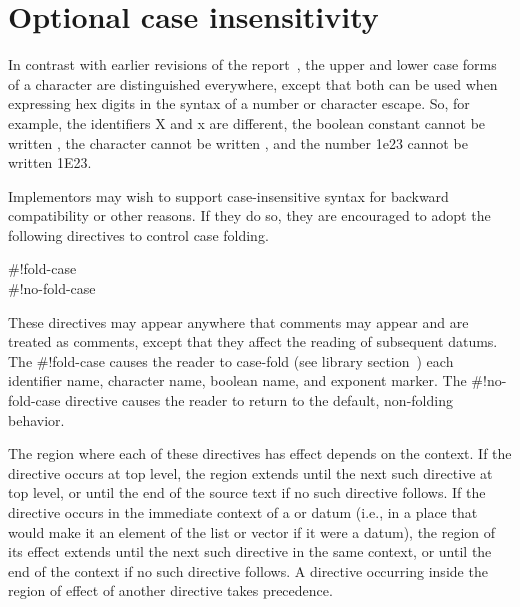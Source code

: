 \chapter{Optional case insensitivity}
\label{caseinsensitivityappendix}

In contrast with earlier revisions of the report~\cite{R5RS}, the upper
and lower case forms of a character are distinguished everywhere, except
that both can be used when expressing hex digits in the syntax of a number
or character escape. 
So, for example, the identifiers {\cf X} and {\cf x} are different, the
boolean constant \schtrue{} cannot be written , the
character  cannot be written , and the
number {\cf 1e23} cannot be written {\cf 1E23}.

Implementors may wish to support case-insensitive syntax for backward
compatibility or other reasons.
If they do so, they are encouraged to adopt the following directives
to control case folding.

\begin{entry}{%
{\cf{}\#!fold-case}\\
{\cf{}\#!no-fold-case}}

These directives may appear anywhere that comments may appear and are
treated as comments, except that they affect the reading of subsequent
datums.
The {\cf{}\#!fold-case} causes the reader to case-fold
(see library section~)
each identifier name, character name, boolean name, and exponent marker.
The {\cf{}\#!no-fold-case} directive causes the reader to return
to the default, non-folding behavior.

The region where each of these directives has effect depends on the
context. If the directive occurs at top level, the region extends
until the next such directive at top level, or until the end of the
source text if no such directive follows.  If the directive occurs in
the immediate context of a  or  datum (i.e.,
in a place that would make it an element of the list or vector if it
were a datum), the region of its effect extends until the next such
directive in the same context, or until the end of the context if no
such directive follows. A directive occurring inside the region of
effect of another directive takes precedence.
\end{entry}


